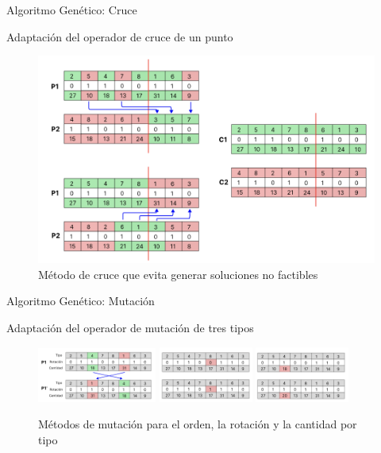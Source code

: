 \documentclass[handout]{beamer}
\begin{document}
\begin{frame}{Algoritmo Genético: Cruce}
    \begin{exampleblock}{Adaptación del operador de cruce de un punto}
        \begin{figure}
            \centering
            \includegraphics[width=.75\textwidth]{pic/ag-cruce.png}
            \caption*{Método de cruce que evita generar soluciones no factibles}
            \label{fig:solucion}
        \end{figure}
    \end{exampleblock}
\end{frame}

\begin{frame}{Algoritmo Genético: Mutación}
    \begin{exampleblock}{Adaptación del operador de mutación de tres tipos}
        \vspace{1cm}
        \begin{figure}[H]
            \centering
            \includegraphics[width=0.35\textwidth]{pic/ag-mutacion1.png}
            \includegraphics[width=0.275\textwidth]{pic/ag-mutacion2.png}
            \includegraphics[width=0.275\textwidth]{pic/ag-mutacion3.png}
            \caption*{Métodos de mutación para el orden, la rotación y la cantidad por tipo}
            \label{fig:mutacion}
        \end{figure}
    \end{exampleblock}
\end{frame}
\end{document}
